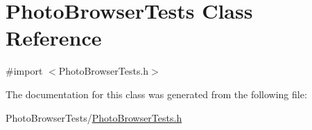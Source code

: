 \hypertarget{interface_photo_browser_tests}{
\section{PhotoBrowserTests Class Reference}
\label{interface_photo_browser_tests}
}


{\ttfamily \#import $<$PhotoBrowserTests.h$>$}



The documentation for this class was generated from the following file:\begin{DoxyCompactItemize}
\item 
PhotoBrowserTests/\hyperlink{_photo_browser_tests_8h}{PhotoBrowserTests.h}\end{DoxyCompactItemize}
